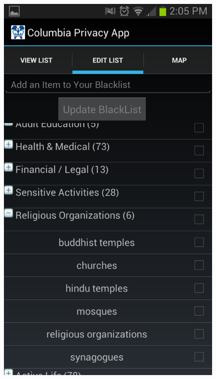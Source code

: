 \begin{figure}[!htb]
{}
	\centering
  \includegraphics[width=0.75\linewidth]{fig/keyword/screenshot_addlist.pdf}
\endminipage\hfill
{}
	\centering

\end{figure}
